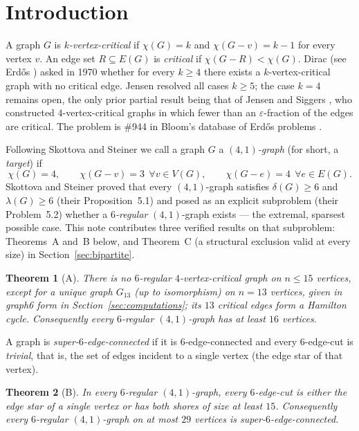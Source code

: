 \documentclass[11pt]{article}
\newtheorem{theorem}{Theorem}[section]
\theoremstyle{remark}
\begin{document}
\section{Introduction}

A graph $G$ is \emph{$k$-vertex-critical} if $\chi(G)=k$ and $\chi(G-v)=k-1$ for
every vertex $v$. An edge set $R\subseteq E(G)$ is \emph{critical} if
$\chi(G-R)<\chi(G)$. Dirac (see Erd\H{o}s \cite{Er89}) asked in 1970 whether for
every $k\ge 4$ there exists a $k$-vertex-critical graph with no critical edge.
Jensen \cite{Je02} resolved all cases $k\ge 5$; the case $k=4$ remains open, the
only prior partial result being that of Jensen and Siggers \cite{JS12}, who
constructed $4$-vertex-critical graphs in which fewer than an $\varepsilon$-fraction
of the edges are critical. The problem is \#944 in Bloom's database of Erd\H{o}s
problems \cite{Bl944}.

Following Skottova and Steiner \cite{SkSt25} we call a graph $G$ a
\emph{$(4,1)$-graph} (for short, a \emph{target}) if
\[
\chi(G)=4,\qquad \chi(G-v)=3\ \ \forall v\in V(G),\qquad \chi(G-e)=4\ \
\forall e\in E(G).
\]
Skottova and Steiner proved that every $(4,1)$-graph satisfies $\delta(G)\ge 6$
and $\lambda(G)\ge 6$ (their Proposition~5.1) and posed as an explicit subproblem
(their Problem~5.2) whether a \emph{$6$-regular} $(4,1)$-graph exists --- the
extremal, sparsest possible case. This note contributes three verified results on
that subproblem: Theorems~A and~B below, and Theorem~C (a structural exclusion
valid at every size) in Section~\ref{sec:bipartite}.

\begin{theorem}[A]\label{thm:A}
There is no $6$-regular $4$-vertex-critical graph on $n\le 15$ vertices, except
for a unique graph $G_{13}$ (up to isomorphism) on $n=13$ vertices, given in
graph6 form in Section~\ref{sec:computations}; its $13$ critical edges form a
Hamilton cycle. Consequently every $6$-regular $(4,1)$-graph has at least $16$
vertices.
\end{theorem}

A graph is \emph{super-$6$-edge-connected} if it is $6$-edge-connected and every
$6$-edge-cut is \emph{trivial}, that is, the set of edges incident to a single
vertex (the edge star of that vertex).

\begin{theorem}[B]\label{thm:B}
In every $6$-regular $(4,1)$-graph, every $6$-edge-cut is either the edge star of a
single vertex or has both shores of size at least $15$. Consequently every
$6$-regular $(4,1)$-graph on at most $29$ vertices is super-$6$-edge-connected.
\end{theorem}
\end{document}
